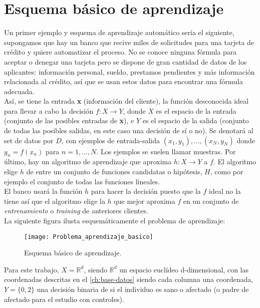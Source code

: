 \section{Esquema básico de aprendizaje}
Un primer ejemplo y esquema de aprendizaje automático sería el siguiente, supongamos que hay un banco que recive miles de solicitudes para una tarjeta de crédito y quiere automatizar el proceso. No se conoce ninguna fórmula para aceptar o denegar una tarjeta pero se dispone de gran cantidad de datos de los aplicantes: información personal, sueldo, prestamos pendientes y más información relacionada al crédito, así que se usan estos datos para encontrar una fórmula adecuada.\\
Así, se tiene la entrada \textbf{x} (información del cliente), la función desconocida ideal para llevar a cabo la decisión $f:X \rightarrow Y$, donde $X$ es el espacio de la entrada (conjunto de las posibles entradas de \textbf{x}), e $Y$ es el espacio de la salida (conjunto de todas las posibles salidas, en este caso una decisión de sí o no). Se denotará al set de datos por $D$, con ejemplos de entrada-salida $(x_{1},y_{1}),...,(x_{N},y_{N})$ donde $y_{n}=f(x_{n})$ para $n=1,...,N$. Los ejemplos se suelen llamar muestras. Por último, hay un algoritmo de aprendizaje que aproxima $h:X \rightarrow Y$ a $f$.  El algoritmo elige $h$ de entre un conjunto de funciones candidatas o hipótesis, $H$, como por ejemplo el conjunto de todas las funciones lineales.\\
El banco usará la función $h$ para hacer la decisión puesto que la $f$ ideal no la tiene así que el algoritmo elige la $h$ que mejor aproxima $f$ en un conjunto de \textit{entrenamiento} o \textit{training} de anteriores clientes. \cite{abu2012learning}\\
La siguiente figura ilusta esquemáticamente el problema de aprendizaje:
\begin{figure}[H]
  \centering
  \texttt{[image: Problema\_aprendizaje\_basico]}
  \caption{Esquema básico de aprendizaje.}
  \label{fig:k-nn-example}
\end{figure}

Para este trabajo, $X=\mathbb{R}^{d}$, siendo $\mathbb{R}^{d}$ un espacio euclídeo d-dimensional, con las coordenadas descritas en el \autoref{ch:base-datos} siendo cada columna una coordenada, $Y=\lbrace 0,2 \rbrace$ una decisión binaria de si el individuo es sano o afectado (o padre de afectado para el estudio con controles).\\
